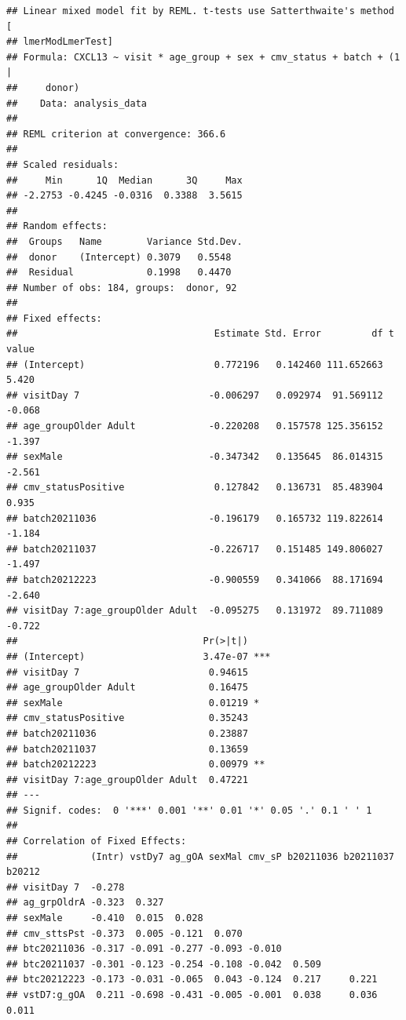 \documentclass[
]{article}
\begin{document}
\begin{verbatim}
## Linear mixed model fit by REML. t-tests use Satterthwaite's method [
## lmerModLmerTest]
## Formula: CXCL13 ~ visit * age_group + sex + cmv_status + batch + (1 |  
##     donor)
##    Data: analysis_data
## 
## REML criterion at convergence: 366.6
## 
## Scaled residuals: 
##     Min      1Q  Median      3Q     Max 
## -2.2753 -0.4245 -0.0316  0.3388  3.5615 
## 
## Random effects:
##  Groups   Name        Variance Std.Dev.
##  donor    (Intercept) 0.3079   0.5548  
##  Residual             0.1998   0.4470  
## Number of obs: 184, groups:  donor, 92
## 
## Fixed effects:
##                                   Estimate Std. Error         df t value
## (Intercept)                       0.772196   0.142460 111.652663   5.420
## visitDay 7                       -0.006297   0.092974  91.569112  -0.068
## age_groupOlder Adult             -0.220208   0.157578 125.356152  -1.397
## sexMale                          -0.347342   0.135645  86.014315  -2.561
## cmv_statusPositive                0.127842   0.136731  85.483904   0.935
## batch20211036                    -0.196179   0.165732 119.822614  -1.184
## batch20211037                    -0.226717   0.151485 149.806027  -1.497
## batch20212223                    -0.900559   0.341066  88.171694  -2.640
## visitDay 7:age_groupOlder Adult  -0.095275   0.131972  89.711089  -0.722
##                                 Pr(>|t|)    
## (Intercept)                     3.47e-07 ***
## visitDay 7                       0.94615    
## age_groupOlder Adult             0.16475    
## sexMale                          0.01219 *  
## cmv_statusPositive               0.35243    
## batch20211036                    0.23887    
## batch20211037                    0.13659    
## batch20212223                    0.00979 ** 
## visitDay 7:age_groupOlder Adult  0.47221    
## ---
## Signif. codes:  0 '***' 0.001 '**' 0.01 '*' 0.05 '.' 0.1 ' ' 1
## 
## Correlation of Fixed Effects:
##             (Intr) vstDy7 ag_gOA sexMal cmv_sP b20211036 b20211037 b20212
## visitDay 7  -0.278                                                       
## ag_grpOldrA -0.323  0.327                                                
## sexMale     -0.410  0.015  0.028                                         
## cmv_sttsPst -0.373  0.005 -0.121  0.070                                  
## btc20211036 -0.317 -0.091 -0.277 -0.093 -0.010                           
## btc20211037 -0.301 -0.123 -0.254 -0.108 -0.042  0.509                    
## btc20212223 -0.173 -0.031 -0.065  0.043 -0.124  0.217     0.221          
## vstD7:g_gOA  0.211 -0.698 -0.431 -0.005 -0.001  0.038     0.036     0.011
\end{verbatim}
\end{document}
